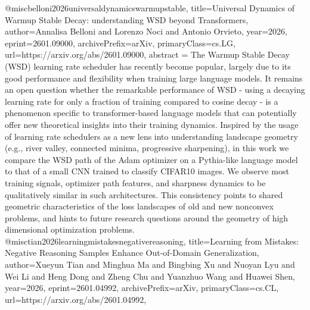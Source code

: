 {}@misc{belloni2026universaldynamicswarmupstable,
      title={Universal Dynamics of Warmup Stable Decay: understanding WSD beyond Transformers}, 
      author={Annalisa Belloni and Lorenzo Noci and Antonio Orvieto},
      year={2026},
      eprint={2601.09000},
      archivePrefix={arXiv},
      primaryClass={cs.LG},
      url={https://arxiv.org/abs/2601.09000},
      abstract = {The Warmup Stable Decay (WSD) learning rate scheduler has recently become popular, largely due to its good performance and flexibility when training large language models. It remains an open question whether the remarkable performance of WSD - using a decaying learning rate for only a fraction of training compared to cosine decay - is a phenomenon specific to transformer-based language models that can potentially offer new theoretical insights into their training dynamics. Inspired by the usage of learning rate schedulers as a new lens into understanding landscape geometry (e.g., river valley, connected minima, progressive sharpening), in this work we compare the WSD path of the Adam optimizer on a Pythia-like language model to that of a small CNN trained to classify CIFAR10 images. We observe most training signals, optimizer path features, and sharpness dynamics to be qualitatively similar in such architectures. This consistency points to shared geometric characteristics of the loss landscapes of old and new nonconvex problems, and hints to future research questions around the geometry of high dimensional optimization problems.}
}@misc{tian2026learningmistakesnegativereasoning,
      title={Learning from Mistakes: Negative Reasoning Samples Enhance Out-of-Domain Generalization}, 
      author={Xueyun Tian and Minghua Ma and Bingbing Xu and Nuoyan Lyu and Wei Li and Heng Dong and Zheng Chu and Yuanzhuo Wang and Huawei Shen},
      year={2026},
      eprint={2601.04992},
      archivePrefix={arXiv},
      primaryClass={cs.CL},
      url={https://arxiv.org/abs/2601.04992},
}
